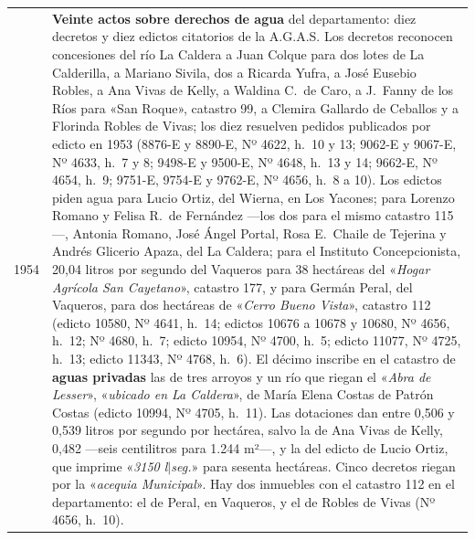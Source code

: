 \begin{longtable}{@{}p{2.7cm}p{10.3cm}@{}}
1954 & \textbf{Veinte actos sobre derechos de agua} del departamento: diez decretos y diez edictos citatorios de la A.G.A.S. Los decretos reconocen concesiones del río La Caldera a Juan Colque para dos lotes de La Calderilla, a Mariano Sivila, dos a Ricarda Yufra, a José Eusebio Robles, a Ana Vivas de Kelly, a Waldina C.\ de Caro, a J.\ Fanny de los Ríos para «San Roque», catastro 99, a Clemira Gallardo de Ceballos y a Florinda Robles de Vivas; los diez resuelven pedidos publicados por edicto en 1953 (8876-E y 8890-E, Nº 4622, h.\ 10 y 13; 9062-E y 9067-E, Nº 4633, h.\ 7 y 8; 9498-E y 9500-E, Nº 4648, h.\ 13 y 14; 9662-E, Nº 4654, h.\ 9; 9751-E, 9754-E y 9762-E, Nº 4656, h.\ 8 a 10). Los edictos piden agua para Lucio Ortiz, del Wierna, en Los Yacones; para Lorenzo Romano y Felisa R.\ de Fernández ---los dos para el mismo catastro 115---, Antonia Romano, José Ángel Portal, Rosa E.\ Chaile de Tejerina y Andrés Glicerio Apaza, del La Caldera; para el Instituto Concepcionista, 20,04 litros por segundo del Vaqueros para 38 hectáreas del «\textit{Hogar Agrícola San Cayetano}», catastro 177, y para Germán Peral, del Vaqueros, para dos hectáreas de «\textit{Cerro Bueno Vista}», catastro 112 (edicto 10580, Nº 4641, h.\ 14; edictos 10676 a 10678 y 10680, Nº 4656, h.\ 12; Nº 4680, h.\ 7; edicto 10954, Nº 4700, h.\ 5; edicto 11077, Nº 4725, h.\ 13; edicto 11343, Nº 4768, h.\ 6). El décimo inscribe en el catastro de \textbf{aguas privadas} las de tres arroyos y un río que riegan el «\textit{Abra de Lesser}», «\textit{ubicado en La Caldera}», de María Elena Costas de Patrón Costas (edicto 10994, Nº 4705, h.\ 11). Las dotaciones dan entre 0,506 y 0,539 litros por segundo por hectárea, salvo la de Ana Vivas de Kelly, 0,482 ---seis centilitros para 1.244 m²---, y la del edicto de Lucio Ortiz, que imprime «\textit{3150 l$|$seg.}» para sesenta hectáreas. Cinco decretos riegan por la «\textit{acequia Municipal}». Hay dos inmuebles con el catastro 112 en el departamento: el de Peral, en Vaqueros, y el de Robles de Vivas (Nº 4656, h.\ 10). \\

\end{longtable}
